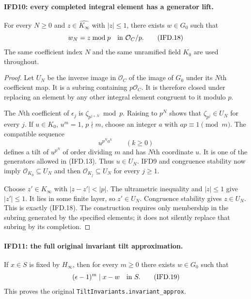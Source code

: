 \documentclass[11pt,a4paper]{article}
\numberwithin{equation}{section}
\theoremstyle{remark}\newtheorem{remark}[theorem]{Remark}
\begin{document}
\paragraph{IFD10: every completed integral element has a generator lift.}
\label{claim:IFD10}
For every $N\geq0$ and $z\in\widehat{K_\infty}$ with $|z|\leq1$,
there exists $w\in G_0$ such that
\[
                  w_N=z\bmod p\quad\hbox{in }\mathcal O_C/p.
                                                               \tag{IFD.18}
\]
The same coefficient index $N$ and the same unramified field $K_0$
are used throughout.

\begin{proof}
Let $U_N$ be the inverse image in $\mathcal O_C$ of the image of
$G_0$ under its $N$th coefficient map. It is a subring containing
$p\mathcal O_C$. It is therefore closed under replacing an element
by any other integral element congruent to it modulo $p$.

The $N$th coefficient of $\epsilon_j$ is
$\zeta_{p^{j+N}}\bmod p$. Raising to $p^N$ shows that
$\zeta_{p^j}\in U_N$ for every $j$.
If $u\in K_0$, $u^m=1$, $p\nmid m$, choose an integer
$a$ with $ap\equiv1\pmod m$. The compatible sequence
\[
                           u^{p^N a^k}\qquad(k\geq0)
\]
defines a tilt of $u^{p^N}$ of order dividing $m$ and has $N$th
coordinate $u$. It is one of the generators allowed in (IFD.13).
Thus $u\in U_N$. IFD9 and congruence stability now imply
$\mathcal O_{K_0}\subseteq U_N$ and then
$\mathcal O_{K_j}\subseteq U_N$ for every $j\geq1$.

Choose $z'\in K_\infty$ with $|z-z'|<|p|$. The ultrametric
inequality and $|z|\leq1$ give $|z'|\leq1$. It lies in some finite
layer, so $z'\in U_N$. Congruence stability gives $z\in U_N$.
This is exactly (IFD.18). The construction requires only membership
in the subring generated by the specified elements; it does not
silently replace that subring by its completion.
\end{proof}

\paragraph{IFD11: the full original invariant tilt approximation.}
\label{claim:IFD11}
If $x\in S$ is fixed by $H_\infty$, then for every $m\geq0$
there exists $w\in G_0$ such that
\[
                           (\epsilon-1)^m\mid x-w
                                      \quad\hbox{in }S.    \tag{IFD.19}
\]
This proves the original \texttt{Tilt\allowbreak Invariants.\allowbreak invariant\_\allowbreak approx}.
\end{document}
